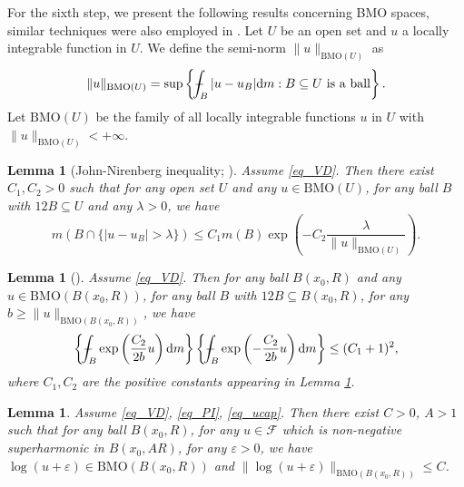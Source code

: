 \documentclass[11pt,a4paper]{article}
\numberwithin{equation}{section}
\def\Xint#1{\mathchoice
{\XXint\displaystyle\textstyle{#1}}%
{\XXint\textstyle\scriptstyle{#1}}%
{\XXint\scriptstyle\scriptscriptstyle{#1}}%
{\XXint\scriptscriptstyle\scriptscriptstyle{#1}}%
\!\int}
\def\XXint#1#2#3{{\setbox0=\hbox{$#1{#2#3}{\int}$ }
\vcenter{\hbox{$#2#3$ }}\kern-.6\wd0}}
\def\dashint{\Xint-}
\theoremstyle{plain}
\newtheorem{lemma}[theorem]{Lemma}
\theoremstyle{definition}
\begin{document}
For the sixth step, we present the following results concerning BMO spaces, similar techniques were also employed in \cite{HY23}. Let $U$ be an open set and $u$ a locally integrable function in $U$. We define the semi-norm $\lVert {u}\rVert_{\mathrm{BMO}(U)}$ as
$$\lVert {u}\rVert_{\mathrm{BMO}(U)}=\sup \left\{\dashint_B|u-u_B|\mathrm{d} m:B\subseteq U\text{ is a ball}\right\}.$$
Let $\mathrm{BMO}(U)$ be the family of all locally integrable functions $u$ in $U$ with $\lVert {u}\rVert_{\mathrm{BMO}(U)}<+\infty$.

\begin{lemma}[John-Nirenberg inequality; {\cite[THEOREM 5.2]{ABKY11}}]\label{lem_JohnNirenberg}
Assume \ref{eq_VD}. Then there exist $C_1,C_2>0$ such that for any open set $U$ and any $u\in \mathrm{BMO}(U)$, for any ball $B$ with $12B\subseteq U$ and any $\lambda>0$, we have
$$m \left(B\cap\{|u-u_B|>\lambda\}\right)\le C_1m(B)\exp \left(-C_2 \frac{\lambda}{\lVert {u}\rVert_{\mathrm{BMO}(U)}}\right).$$
\end{lemma}

\begin{lemma}[{\cite[COROLLARY 5.6]{BM95AMPA}}]\label{lem_crossover}
Assume \ref{eq_VD}. Then for any ball $B(x_0,R)$ and any $u\in\mathrm{BMO}(B(x_0,R))$, for any ball $B$ with $12B\subseteq B(x_0,R)$, for any $b\ge \lVert {u}\rVert_{\mathrm{BMO}(B(x_0,R))}$, we have
$$\left\{\dashint_{B}\exp \left(\frac{C_2}{2b}u\right)\mathrm{d} m\right\}\left\{\dashint_{B}\exp \left(-\frac{C_2}{2b}u\right)\mathrm{d} m\right\}\le (C_1+1)^2,$$
where $C_1,C_2$ are the positive constants appearing in Lemma \ref{lem_JohnNirenberg}.
\end{lemma}

\begin{lemma}\label{lem_loguBMO}
Assume \ref{eq_VD}, \ref{eq_PI}, \ref{eq_ucap}. Then there exist $C>0$, $A>1$ such that for any ball $B(x_0,R)$, for any $u\in\mathcal{F}$ which is non-negative superharmonic in $B(x_0,AR)$, for any $\varepsilon>0$, we have $\log(u+\varepsilon)\in\mathrm{BMO}(B(x_0,R))$ and $\lVert {\log (u+\varepsilon)}\rVert_{\mathrm{BMO}(B(x_0,R))}\le C$.
\end{lemma}
\end{document}
